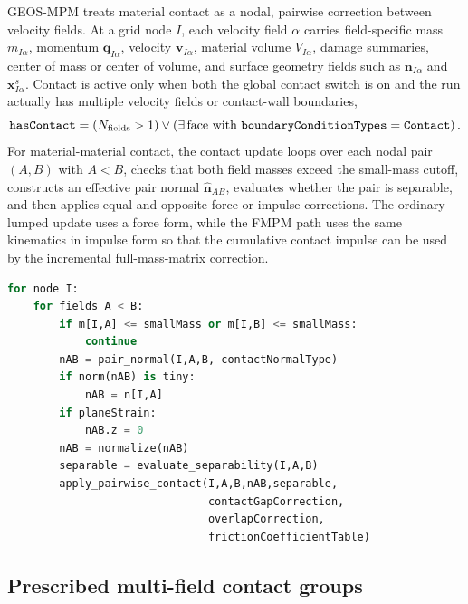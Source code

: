 GEOS-MPM treats material contact as a nodal, pairwise correction between velocity fields.  At a grid node $I$, each velocity field $\alpha$ carries field-specific mass $m_{I\alpha}$, momentum $\mathbf{q}_{I\alpha}$, velocity $\mathbf{v}_{I\alpha}$, material volume $V_{I\alpha}$, damage summaries, center of mass or center of volume, and surface geometry fields such as $\mathbf{n}_{I\alpha}$ and $\mathbf{x}^{s}_{I\alpha}$.  Contact is active only when both the global contact switch is on and the run actually has multiple velocity fields or contact-wall boundaries,
\begin{equation}
  \texttt{hasContact} =
  \left(N_{\mathrm{fields}}>1\right)
  \lor
  \left(\exists\,\hbox{face with }\texttt{boundaryConditionTypes}=\texttt{Contact}\right).
\end{equation}
For material-material contact, the contact update loops over each nodal pair $(A,B)$ with $A<B$, checks that both field masses exceed the small-mass cutoff, constructs an effective pair normal $\hat{\mathbf{n}}_{AB}$, evaluates whether the pair is separable, and then applies equal-and-opposite force or impulse corrections.  The ordinary lumped update uses a force form, while the FMPM path uses the same kinematics in impulse form so that the cumulative contact impulse can be used by the incremental full-mass-matrix correction.

\begin{lstlisting}[language=Python,caption={Solver-level material contact loop.}]
for node I:
    for fields A < B:
        if m[I,A] <= smallMass or m[I,B] <= smallMass:
            continue
        nAB = pair_normal(I,A,B, contactNormalType)
        if norm(nAB) is tiny:
            nAB = n[I,A]
        if planeStrain:
            nAB.z = 0
        nAB = normalize(nAB)
        separable = evaluate_separability(I,A,B)
        apply_pairwise_contact(I,A,B,nAB,separable,
                               contactGapCorrection,
                               overlapCorrection,
                               frictionCoefficientTable)
\end{lstlisting}

\subsection{Prescribed multi-field contact groups}
\label{subsec:prescribed-multifield-contact}

